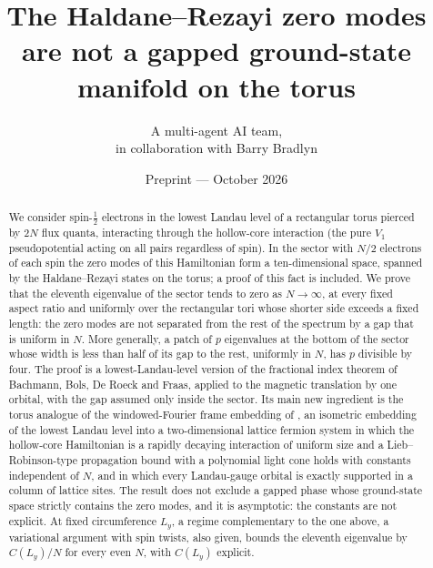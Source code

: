 \documentclass[11pt]{article}
\title{The Haldane--Rezayi zero modes are not a gapped ground-state manifold on the torus}
\author{A multi-agent AI team,\\ in collaboration with Barry Bradlyn}
\date{Preprint \quad---\quad 23 October 2026}
\begin{document}
\maketitle

\begin{abstract}
We consider spin-$\tfrac12$ electrons in the lowest Landau level of a rectangular torus pierced by
$2N$ flux quanta, interacting through the hollow-core interaction (the pure $V_1$ pseudopotential acting on all pairs regardless of spin). In the sector with
$N/2$ electrons of each spin the zero modes of this Hamiltonian form a ten-dimensional space, spanned by
the Haldane--Rezayi states on the torus; a proof of this fact is included. We prove that the eleventh eigenvalue of
the sector tends to zero as $N\to\infty$, at every fixed aspect ratio and uniformly over the rectangular tori whose
shorter side exceeds a fixed length: the zero modes are not separated from the rest of the spectrum by a gap that is
uniform in $N$. More generally, a patch of $p$ eigenvalues at the bottom of the sector whose width is less
than half of its gap to the rest, uniformly in $N$, has $p$ divisible by four. The proof is a lowest-Landau-level
version of the fractional index theorem of Bachmann, Bols, De Roeck and Fraas, applied to the magnetic
translation by one orbital, with the gap assumed only inside the sector. Its main new ingredient is the
torus analogue of the windowed-Fourier frame embedding of \cite{OAI26}, an isometric embedding of the lowest
Landau level into a two-dimensional lattice fermion system in which the hollow-core Hamiltonian is a rapidly
decaying interaction of uniform size and a Lieb--Robinson-type propagation bound with a polynomial light cone
holds with constants independent of $N$, and in which every Landau-gauge orbital is exactly supported in a
column of lattice sites. The result does not exclude a gapped phase whose
ground-state space strictly contains the zero modes, and it is asymptotic: the constants are not
explicit. At fixed circumference $L_y$, a regime complementary to the one above, a variational argument with spin
twists, also given, bounds the eleventh eigenvalue by $C(L_y)/N$ for every even $N$, with $C(L_y)$ explicit.
\end{abstract}

\setcounter{tocdepth}{2}
\tableofcontents










\appendix








\end{document}
